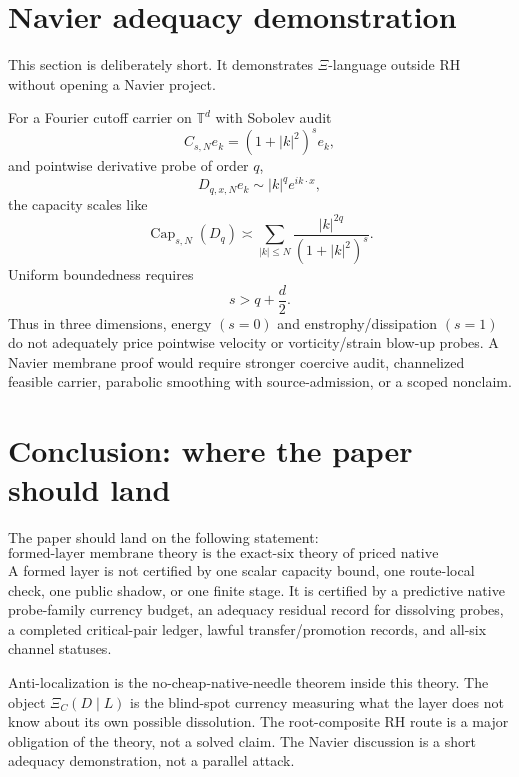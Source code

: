 \documentclass[11pt]{article}
\DeclareMathOperator{\Capacity}{Cap}
\begin{document}
\section{Navier adequacy demonstration}

This section is deliberately short.  It demonstrates \(\Xi\)-language outside RH without opening a Navier project.

For a Fourier cutoff carrier on \(\mathbb T^d\) with Sobolev audit
\[
  C_{s,N}e_k=(1+|k|^2)^s e_k,
\]
and pointwise derivative probe of order \(q\),
\[
  D_{q,x,N}e_k\sim |k|^qe^{ik\cdot x},
\]
the capacity scales like
\[
  \Capacity_{s,N}(D_q)\asymp\sum_{|k|\le N}\frac{|k|^{2q}}{(1+|k|^2)^s}.
\]
Uniform boundedness requires
\[
  s>q+\frac d2.
\]
Thus in three dimensions, energy \((s=0)\) and enstrophy/dissipation \((s=1)\) do not adequately price pointwise velocity or vorticity/strain blow-up probes.  A Navier membrane proof would require stronger coercive audit, channelized feasible carrier, parabolic smoothing with source-admission, or a scoped nonclaim.

\section{Conclusion: where the paper should land}

The paper should land on the following statement:
\[
\boxed{\text{formed-layer membrane theory is the exact-six theory of priced native addressability.}}
\]
A formed layer is not certified by one scalar capacity bound, one route-local check, one public shadow, or one finite stage.  It is certified by a predictive native probe-family currency budget, an adequacy residual record for dissolving probes, a completed critical-pair ledger, lawful transfer/promotion records, and all-six channel statuses.

Anti-localization is the no-cheap-native-needle theorem inside this theory.  The object \(\Xi_C(D\mid L)\) is the blind-spot currency measuring what the layer does not know about its own possible dissolution.  The root-composite RH route is a major obligation of the theory, not a solved claim.  The Navier discussion is a short adequacy demonstration, not a parallel attack.
\end{document}
